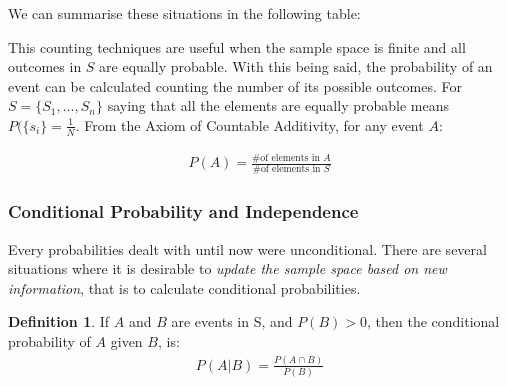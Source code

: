 \documentclass[
  oneside,
  11pt, a4paper,
  footinclude=true,
  headinclude=true,
  cleardoublepage=empty
]{scrbook}
\theoremstyle{definition}
\newtheorem{definition}{Definition}[section]
\theoremstyle{definition}
\begin{document}
        We can summarise these situations in the following table:
        \begin{table}[h]
            \centering
            \caption{Number of possible arrangements of size $r$ from $n$ objects}
            \label{tab:my-table}
        \end{table}
        
        This counting techniques are useful when the sample space is finite and all outcomes in $S$ are equally probable. With this being said, the probability of an event can be calculated counting the number of its possible outcomes. For $S = \{S_1, ..., S_n\}$ saying that all the elements are equally probable means $P(\{s_i\} = \frac{1}{N}$. From the Axiom of Countable Additivity, for any event $A$:
        
        \begin{align*}
            P(A) = \frac{\text{\# of elements in $A$}}{\text{\# of elements in $S$}}
        \end{align*}{}
        
        \subsubsection{Conditional Probability and Independence}
        
        Every probabilities dealt with until now were unconditional. There are several situations where it is desirable to \emph{update the sample space based on new information}, that is to calculate conditional probabilities.
        
        \begin{definition}{If $A$ and $B$ are events in S, and $P(B) > 0$, then the conditional probability of $A$ given $B$, is:}\label{d-2-1-6}
            \begin{align*}
                P(A|B) = \frac{P(A \cap B)}{P(B)}
            \end{align*}{}
        \end{definition}{}
        
\end{document}
